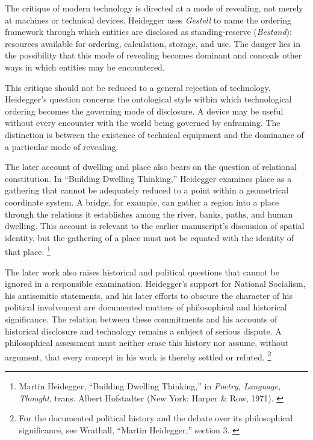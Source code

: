 \label{para:VS.B01.P01.C08.S11.SS12.P002}

The critique of modern technology is directed
at a mode of revealing, not merely at machines
or technical devices. Heidegger uses
\textit{Gestell} to name the ordering framework
through which entities are disclosed as
standing-reserve (\textit{Bestand}): resources
available for ordering, calculation, storage,
and use. The danger lies in the possibility
that this mode of revealing becomes dominant
and conceals other ways in which entities
may be encountered.
\cite{WrathallHeideggerSEP2025}

\label{para:VS.B01.P01.C08.S11.SS12.P003}

This critique should not be reduced to a
general rejection of technology. Heidegger's
question concerns the ontological style
within which technological ordering becomes
the governing mode of disclosure. A device
may be useful without every encounter with
the world being governed by enframing.
The distinction is between the existence
of technical equipment and the dominance
of a particular mode of revealing.
\cite{WrathallHeideggerSEP2025}

\label{para:VS.B01.P01.C08.S11.SS12.P004}

The later account of dwelling and place also
bears on the question of relational constitution.
In ``Building Dwelling Thinking,'' Heidegger
examines place as a gathering that cannot be
adequately reduced to a point within a
geometrical coordinate system. A bridge, for
example, can gather a region into a place
through the relations it establishes among
the river, banks, paths, and human dwelling.
This account is relevant to the earlier
manuscript's discussion of spatial identity,
but the gathering of a place must not be
equated with the identity of that place.
\footnote{Martin Heidegger, ``Building Dwelling
Thinking,'' in \textit{Poetry, Language, Thought},
trans. Albert Hofstadter (New York: Harper \&
Row, 1971). \cite{HeideggerPoetryLanguageThought1971}}

\label{para:VS.B01.P01.C08.S11.SS12.P005}

The later work also raises historical and
political questions that cannot be ignored
in a responsible examination. Heidegger's
support for National Socialism, his antisemitic
statements, and his later efforts to obscure
the character of his political involvement
are documented matters of philosophical
and historical significance. The relation
between these commitments and his accounts
of historical disclosure and technology
remains a subject of serious dispute. A
philosophical assessment must neither
erase this history nor assume, without
argument, that every concept in his work
is thereby settled or refuted.
\footnote{For the documented political history
and the debate over its philosophical
significance, see Wrathall, ``Martin Heidegger,''
section 3. \cite{WrathallHeideggerSEP2025}}


